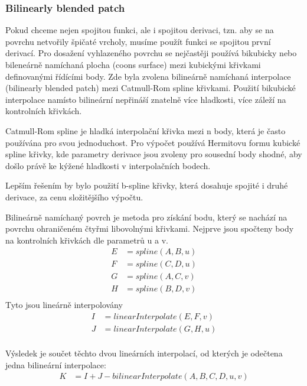 \documentclass{zcu_sp}
\begin{document}
\subsubsection{Bilinearly blended patch} 
Pokud chceme nejen spojitou funkci, ale i spojitou derivaci, tzn. aby se na
povrchu netvořily špičaté vrcholy, musíme použít funkci se spojitou první
derivací. Pro dosažení vyhlazeného povrchu se nejčastěji používá bikubicky nebo
bileneárně namíchaná plocha (coons surface)\cite{wikicoons}\cite{rose-hulman}
mezi kubickými křivkami definovanými řídícími body.  Zde byla zvolena
bilineárně namíchaná interpolace (bilinearly blended patch) mezi Catmull-Rom
spline křivkami.  Použití bikubické interpolace namísto bilineární nepřináší
znatelně více hladkosti, více záleží na kontrolních křivkách.

Catmull-Rom spline je hladká interpolační křivka mezi n body, která je často
používána pro svou jednoduchost. Pro výpočet používá Hermitovu formu kubické
spline křivky, kde parametry derivace jsou zvoleny pro sousední body shodné,
aby došlo právě ke kýžené hladkosti v interpolačních bodech.

Lepším řešením by bylo použití b-spline křivky, která dosahuje spojité i druhé
derivace, za cenu složitějšího výpočtu.

Bilineárně namíchaný povrch je metoda pro získání bodu, který se nachází na
povrchu ohraničeném čtyřmi libovolnými křivkami.  Nejprve jsou spočteny body na
kontrolních křivkách dle parametrů u a v. 
\begin{align*}
E &= spline(A, B, u) \\
F &= spline(C, D, u) \\
G &= spline(A, C, v) \\
H &= spline(B, D, v) \\
\end{align*}
Tyto jsou lineárně interpolovány
\begin{align*}
I &= linearInterpolate(E, F, v) \\
J &= linearInterpolate(G, H, u) \\
\end{align*}

Výsledek je součet těchto dvou lineárních interpolací, od kterých je odečtena jedna bilineární interpolace:
\begin{align*}
K &= I + J - bilinearInterpolate(A, B, C, D, u, v) \\
\end{align*}
\end{document}

